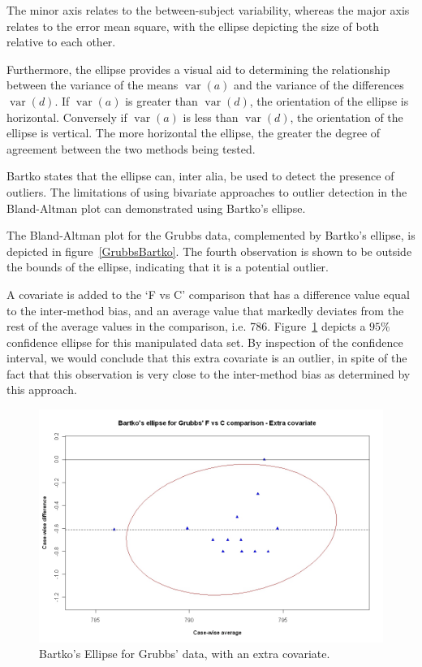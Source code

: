 \documentclass[12pt, a4paper]{report}
\theoremstyle{plain}
\theoremstyle{definition}
\theoremstyle{remark}
\begin{document}
	The minor axis relates to the between-subject variability, whereas the major axis relates to the error mean square, with the ellipse depicting the size of both relative to each other.
	
	Furthermore, the ellipse provides a visual aid to determining the relationship between the variance of the means $\operatorname{var}(a)$ and the variance of the differences $\operatorname{var}(d)$. If $\operatorname{var}(a)$ is greater than $\operatorname{var}(d)$, the orientation of the ellipse is horizontal. Conversely if $\operatorname{var}(a)$ is less than $\operatorname{var}(d)$, the orientation of the ellipse is vertical. The more horizontal the ellipse, the greater the degree of agreement between the two methods being tested.
	
	
	Bartko states that the ellipse can, inter alia, be used to detect the presence of outliers. The limitations of using bivariate approaches to outlier detection in the Bland-Altman plot can demonstrated using Bartko's ellipse.
	
	
	The Bland-Altman plot for the Grubbs data, complemented by Bartko's ellipse, is depicted in figure~\ref{GrubbsBartko}.
	The fourth observation is shown to be outside the bounds of the ellipse, indicating that it is a potential outlier.
	
	A covariate is added to the `F vs C' comparison that has a difference value equal to the inter-method bias, and an average value that markedly deviates from the rest of the average values
	in the comparison, i.e. 786. Figure~\ref{GrubbsBartko2} depicts a $95\%$ confidence
	ellipse for this manipulated data set. By inspection of the confidence interval, we would conclude that this extra covariate is an outlier, in spite of the fact that this observation is very close to the inter-method bias as determined by this approach.
	
	\begin{figure}[h!]
		\includegraphics[width=130mm]{images/GrubbsBartko2.jpeg}
		\caption{Bartko's Ellipse for Grubbs' data, with an extra covariate.}\label{GrubbsBartko2}
	\end{figure}
	
\end{document}
